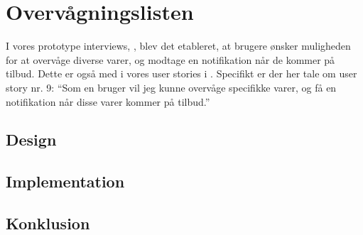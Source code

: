 \section{Overvågningslisten}
I vores prototype interviews, , blev det etableret, at brugere ønsker muligheden for at overvåge diverse varer, og modtage en notifikation når de kommer på tilbud.
Dette er også med i vores user stories i .
Specifikt er der her tale om user story nr. 9: ``Som en bruger vil jeg kunne overvåge specifikke varer, og få en notifikation når disse varer kommer på tilbud.''
\subsection{Design}

\subsection{Implementation}
\subsection{Konklusion}
